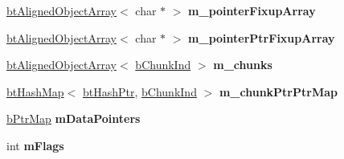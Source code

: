 \begin{DoxyCompactItemize}
\item 
\hypertarget{classb_parse_1_1b_file_a26c8befb4e7790a9c1dfd68b64ba4315}{\hyperlink{classbt_aligned_object_array}{bt\+Aligned\+Object\+Array}$<$ char $\ast$ $>$ {\bfseries m\+\_\+pointer\+Fixup\+Array}}\label{classb_parse_1_1b_file_a26c8befb4e7790a9c1dfd68b64ba4315}

\item 
\hypertarget{classb_parse_1_1b_file_a3190a5c1b55d135eb88762d01c8e1052}{\hyperlink{classbt_aligned_object_array}{bt\+Aligned\+Object\+Array}$<$ char $\ast$ $>$ {\bfseries m\+\_\+pointer\+Ptr\+Fixup\+Array}}\label{classb_parse_1_1b_file_a3190a5c1b55d135eb88762d01c8e1052}

\item 
\hypertarget{classb_parse_1_1b_file_a439e5beeb0b62d226b76374361c15d5a}{\hyperlink{classbt_aligned_object_array}{bt\+Aligned\+Object\+Array}$<$ \hyperlink{classb_parse_1_1b_chunk_ind}{b\+Chunk\+Ind} $>$ {\bfseries m\+\_\+chunks}}\label{classb_parse_1_1b_file_a439e5beeb0b62d226b76374361c15d5a}

\item 
\hypertarget{classb_parse_1_1b_file_a56687f687040b037acdd24e196cdda8b}{\hyperlink{classbt_hash_map}{bt\+Hash\+Map}$<$ \hyperlink{classbt_hash_ptr}{bt\+Hash\+Ptr}, \hyperlink{classb_parse_1_1b_chunk_ind}{b\+Chunk\+Ind} $>$ {\bfseries m\+\_\+chunk\+Ptr\+Ptr\+Map}}\label{classb_parse_1_1b_file_a56687f687040b037acdd24e196cdda8b}

\item 
\hypertarget{classb_parse_1_1b_file_a03276b8f9ddd01c5f5e041747b3abb20}{\hyperlink{classbt_hash_map}{b\+Ptr\+Map} {\bfseries m\+Data\+Pointers}}\label{classb_parse_1_1b_file_a03276b8f9ddd01c5f5e041747b3abb20}

\item 
\hypertarget{classb_parse_1_1b_file_ae64c75b8f5fc03576fab4dfdf30dabcb}{int {\bfseries m\+Flags}}\label{classb_parse_1_1b_file_ae64c75b8f5fc03576fab4dfdf30dabcb}

\end{DoxyCompactItemize}


